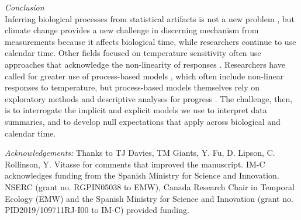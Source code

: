 \documentclass[11pt,letter]{article}
\begin{document}

\emph{Conclusion}\\
Inferring biological processes from statistical artifacts is not a new problem \citep[e.g.,][]{nee2005}, but climate change provides a new challenge in discerning mechanism from measurements because it affects biological time, while researchers continue to use calendar time. Other fields focused on temperature sensitivity often use approaches that acknowledge the non-linearity of responses \citep[e.g.,][]{yuste2004}. Researchers have called for greater use of process-based models \citep{keenan2019}, which often include non-linear responses to temperature, but process-based models themselves rely on exploratory methods and descriptive analyses for progress \citep{chuine2016}. The challenge, then, is to interrogate the implicit and explicit models we use to interpret data summaries, and to develop null expectations that apply across biological and calendar time. \\



\vspace{5ex}

\emph{Acknowledgements:} Thanks to TJ Davies, TM Giants, Y. Fu, D. Lipson, C. Rollinson, Y. Vitasse for comments that improved the manuscript.  IM-C acknowledges funding from the Spanish Ministry for Science and Innovation. NSERC (grant no. RGPIN­05038 to EMW), Canada Research Chair in Temporal Ecology (EMW) and the Spanish Ministry for Science and Innovation (grant no. PID2019/109711RJ-I00 to IM-C) provided funding. 
\\ %
\end{document}
